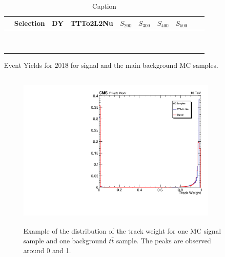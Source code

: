 \documentclass{cernatlasnote}
\begin{document}
\begin{appendices}
\begin{table}
    \centering
    \begin{tabular}{ |c|c|c|c|c|c|c|c|c|c|}
    \hline
         & Selection & DY & TTTo2L2Nu & $S_{200}$ & $S_{300}$ & $S_{400}$ & $S_{500}$ \\
         \hline
         &  &  &  &  &  &  &   \\
         \hline
         &  &  &  &  &  &  &   \\
         \hline
         &  &  &  &  &  &  &  \\
         \hline
         &  &  &  &  &  &  &  \\
         \hline
         &  &  &  &  &  &  &  \\
         \hline
         &  &  &  &  &  &  &  \\
         \hline
         &  &  &  &  &  &  &   \\
         \hline
         &  &  &  &  &  &  &   \\
         \hline
         &  &  &  &  &  &  &   \\
    \hline
    \end{tabular}
    \caption{Caption}
    \label{tab:EVTYIELS2018} Event Yields for 2018 for signal and the main background MC samples.
\end{table}

\begin{figure}[ht]
\centering
\includegraphics[height=8cm, width=10cm, trim= 0cm 0cm 0cm 0cm,clip]{images/VTXEff/TrackWeightCompare.pdf}
\caption{\label{fig:ITW} Example of the distribution of the track weight for one MC signal sample and one background $t\bar{t}$ sample. The peaks are observed around 0 and 1.}
\end{figure} 


\end{appendices}
\end{document}

